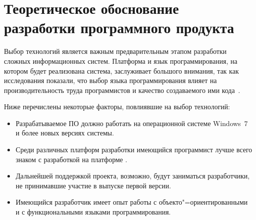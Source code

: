 
\section{Теоретическое обоснование разработки программного продукта} 
\label{sec:theory_and_motivation}

Выбор технологий является важным предварительным этапом разработки сложных информационных систем.
Платформа и язык программирования, на котором будет реализована система, заслуживает большого внимания, так как исследования показали, что выбор языка программирования влияет на производительность труда программистов и качество создаваемого ими кода~\cite[c.~59]{mcconnell_2005}.

Ниже перечислены некоторые факторы, повлиявшие на выбор технологий:
\begin{itemize}
\item Разрабатываемое ПО должно работать на операционной системе Windows~7 и более новых версиях системы.
\item Среди различных платформ разработки имеющийся программист лучше всего знаком с разработкой на платформе \dotnet{}.
\item Дальнейшей поддержкой проекта, возможно, будут заниматься разработчики, не принимавшие участие в выпуске первой версии.
\item Имеющийся разработчик имеет опыт работы с объекто"=ориентированными и с функциональными языками программирования.
\end{itemize}

